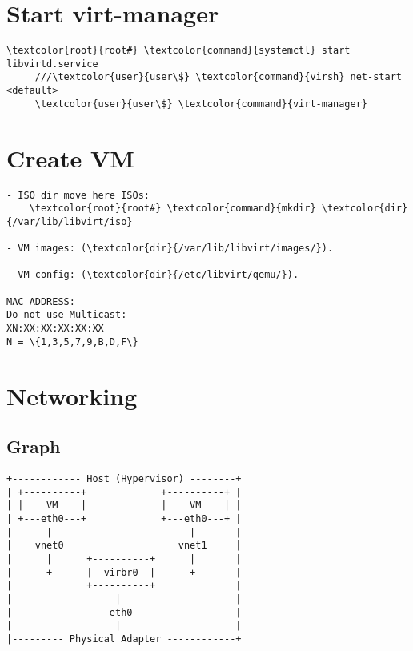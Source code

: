 \documentclass[10pt, a4paper, onecolumn, openany]{book} %
\begin{document}
\section{Start virt-manager}
\begin{Verbatim}[commandchars=\\\{\}]
     \textcolor{root}{root#} \textcolor{command}{systemctl} start libvirtd.service
     ///\textcolor{user}{user\$} \textcolor{command}{virsh} net-start <default>
     \textcolor{user}{user\$} \textcolor{command}{virt-manager}
\end{Verbatim}

\section{Create VM}
\begin{Verbatim}[commandchars=\\\{\}]
- ISO dir move here ISOs:
    \textcolor{root}{root#} \textcolor{command}{mkdir} \textcolor{dir}{/var/lib/libvirt/iso}

- VM images: (\textcolor{dir}{/var/lib/libvirt/images/}).

- VM config: (\textcolor{dir}{/etc/libvirt/qemu/}).

MAC ADDRESS:
Do not use Multicast:
XN:XX:XX:XX:XX:XX
N = \{1,3,5,7,9,B,D,F\}
\end{Verbatim}

\section{Networking}
\subsection{Graph}
\begin{Verbatim}[commandchars=\\\{\}]
+------------ Host (Hypervisor) --------+
| +----------+             +----------+ |
| |    VM    |             |    VM    | |
| +---eth0---+             +---eth0---+ |
|      |                        |       |
|    vnet0                    vnet1     |
|      |      +----------+      |       |
|      +------|  virbr0  |------+       |
|             +----------+              |
|                  |                    |
|                 eth0                  |
|                  |                    |
|--------- Physical Adapter ------------+
\end{Verbatim}
\end{document}
